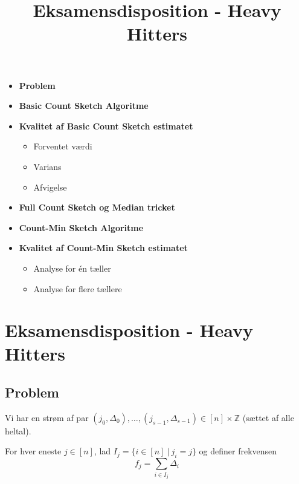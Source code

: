 
\title{Eksamensdisposition - Heavy Hitters}


\maketitle

\begin{itemize}
  \item \textbf{Problem}
  \item \textbf{Basic Count Sketch Algoritme}
  \item \textbf{Kvalitet af Basic Count Sketch estimatet}
  \begin{itemize}
    \item Forventet værdi
    \item Varians
    \item Afvigelse
  \end{itemize}
  \item \textbf{Full Count Sketch og Median tricket}
  \item \textbf{Count-Min Sketch Algoritme}
  \item \textbf{Kvalitet af Count-Min Sketch estimatet}
  \begin{itemize}
    \item Analyse for én tæller
    \item Analyse for flere tællere
  \end{itemize}
\end{itemize}


\newpage
\section{Eksamensdisposition - Heavy Hitters}

\subsection{Problem}

Vi har en strøm af par $(j_0, \Delta_0), \dots, (j_{s-1}, \Delta_{s-1}) \in [n]\times \mathbb Z$ (sættet af alle heltal).

For hver eneste $j \in [n]$, lad $I_j = \{ i \in [n] \ | \ j_i = j \}$ og definer frekvensen
$$
f_j = \sum_{i \in I_j} \Delta_i
$$

